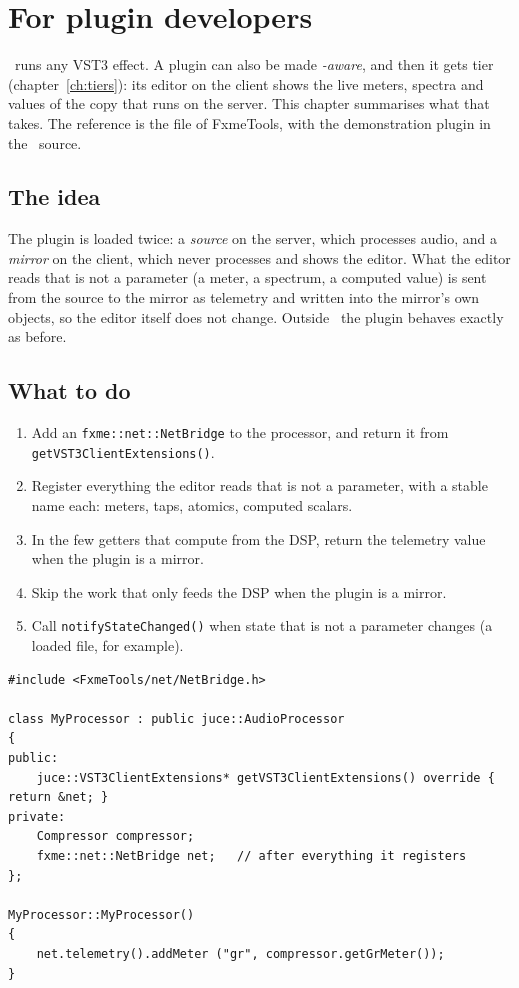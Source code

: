 \chapter{For plugin developers}
\label{ch:developers}

\fxme\ runs any VST3 effect. A plugin can also be made \emph{\fxme-aware}, and
then it gets tier  (chapter~\ref{ch:tiers}): its editor on the
client shows the live meters, spectra and values of the copy that runs on
the server. This chapter summarises what that takes. The reference is the
file  of FxmeTools, with the demonstration plugin
 in the \fxme\ source.

\section{The idea}

The plugin is loaded twice: a \emph{source} on the server, which processes
audio, and a \emph{mirror} on the client, which never processes and shows
the editor. What the editor reads that is not a parameter (a meter, a
spectrum, a computed value) is sent from the source to the mirror as
telemetry and written into the mirror's own objects, so the editor itself
does not change. Outside \fxme\ the plugin behaves exactly as before.

\section{What to do}

\begin{enumerate}
  \item Add an \texttt{fxme::net::NetBridge} to the processor, and return it from
    \texttt{getVST3Client\allowbreak Extensions()}.
  \item Register everything the editor reads that is not a parameter, with a
    stable name each: meters, taps, atomics, computed scalars.
  \item In the few getters that compute from the DSP, return the telemetry
    value when the plugin is a mirror.
  \item Skip the work that only feeds the DSP when the plugin is a mirror.
  \item Call \texttt{notifyStateChanged()} when state that is not a parameter
    changes (a loaded file, for example).
\end{enumerate}

\begin{lstlisting}[style=fxcode]
#include <FxmeTools/net/NetBridge.h>

class MyProcessor : public juce::AudioProcessor
{
public:
    juce::VST3ClientExtensions* getVST3ClientExtensions() override { return &net; }
private:
    Compressor compressor;
    fxme::net::NetBridge net;   // after everything it registers
};

MyProcessor::MyProcessor()
{
    net.telemetry().addMeter ("gr", compressor.getGrMeter());
}
\end{lstlisting}

